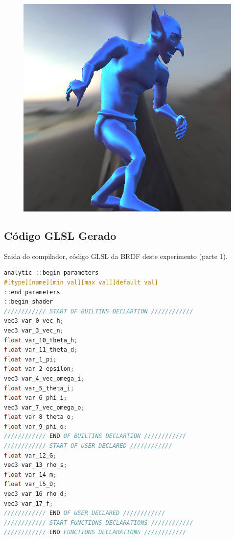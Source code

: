 \begin{figure}[H]
\endminipage\hfill
{}%
  \includegraphics[width=\linewidth]{./Imagens/brdfs/cook-torrance-goblin.png}
\endminipage
\end{figure}

\subsection{Código GLSL Gerado}
\begin{codigo}[H]
    \caption{\small Saida do compilador, código GLSL da BRDF deste experimento (parte 1). }
    \label{cod-cook-torrance-glsl-pt-1}
\begin{lstlisting}[language=C, inputencoding=utf8]
analytic ::begin parameters
#[type][name][min val][max val][default val]
::end parameters
::begin shader
//////////// START OF BUILTINS DECLARTION ////////////
vec3 var_0_vec_h;
vec3 var_3_vec_n;
float var_10_theta_h;
float var_11_theta_d;
float var_1_pi;
float var_2_epsilon;
vec3 var_4_vec_omega_i;
float var_5_theta_i;
float var_6_phi_i;
vec3 var_7_vec_omega_o;
float var_8_theta_o;
float var_9_phi_o;
//////////// END OF BUILTINS DECLARTION ////////////
//////////// START OF USER DECLARED ////////////
float var_12_G;
vec3 var_13_rho_s;
float var_14_m;
float var_15_D;
vec3 var_16_rho_d;
vec3 var_17_f;
//////////// END OF USER DECLARED ////////////
//////////// START FUNCTIONS DECLARATIONS ////////////
//////////// END FUNCTIONS DECLARATIONS ////////////
\end{lstlisting}
\end{codigo}

